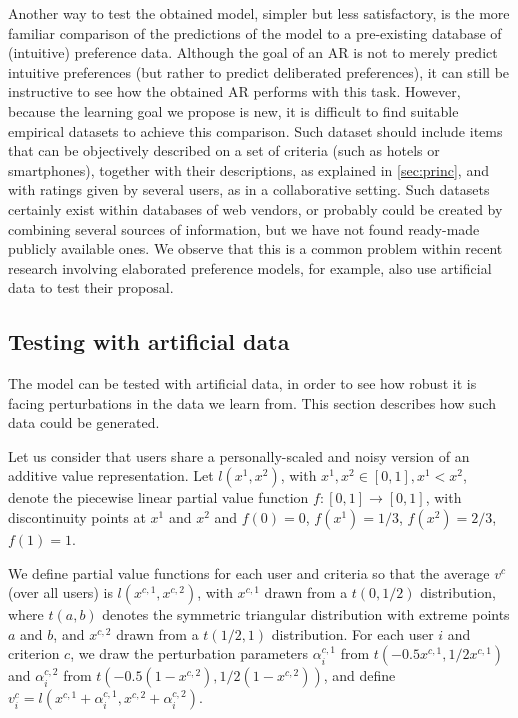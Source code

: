 \documentclass[version=3.21, pagesize, twoside=off, bibliography=totoc, DIV=calc, fontsize=12pt, a4paper, french, english]{scrartcl}
\begin{document}
Another way to test the obtained model, simpler but less satisfactory, is the more familiar comparison of the predictions of the model to a pre-existing database of (intuitive) preference data. Although the goal of an \ac{AR} is not to merely predict intuitive preferences (but rather to predict deliberated preferences), it can still be instructive to see how the obtained \ac{AR} performs with this task.
However, because the learning goal we propose is new, it is difficult to find suitable empirical datasets to achieve this comparison. Such dataset should include items that can be objectively described on a set of criteria (such as hotels or smartphones), together with their descriptions, as explained in \cref{sec:princ}, and with ratings given by several users, as in a collaborative setting. Such datasets certainly exist within databases of web vendors, or probably could be created by combining several sources of information, but we have not found ready-made publicly available ones. We observe that this is a common problem within recent research involving elaborated preference models, for example, \citet{teso_constructive_2016} also use artificial data to test their proposal.

\subsection{Testing with artificial data}
The model can be tested with artificial data, in order to see how robust it is facing perturbations in the data we learn from. This section describes how such data could be generated.

Let us consider that users share a personally-scaled and noisy version of an additive value representation. 
Let $l(x^1, x^2)$, with $x^1, x^2 \in [0, 1], x^1 < x^2$, denote the piecewise linear partial value function $f: [0, 1] → [0, 1]$, with discontinuity points at $x^1$ and $x^2$ and $f(0) = 0$, $f(x^1) = 1/3$, $f(x^2) = 2/3$, $f(1) = 1$.

We define partial value functions for each user and criteria so that the average $v^c$ (over all users) is $l(x^{c, 1}, x^{c, 2})$, with $x^{c, 1}$ drawn from a $t(0, 1/2)$ distribution, where $t(a, b)$ denotes the symmetric triangular distribution with extreme points $a$ and $b$, and $x^{c, 2}$ drawn from a $t(1/2, 1)$ distribution.
For each user $i$ and criterion $c$, we draw the perturbation parameters $\alpha^{c, 1}_i$ from $t(-0.5 x^{c, 1}, 1/2 x^{c, 1})$ and $\alpha^{c, 2}_i$ from $t(-0.5 (1-x^{c, 2}), 1/2 (1-x^{c, 2}))$, and define $v^c_i = l(x^{c, 1}+\alpha^{c, 1}_i, x^{c, 2} + \alpha^{c, 2}_i)$.
\end{document}
